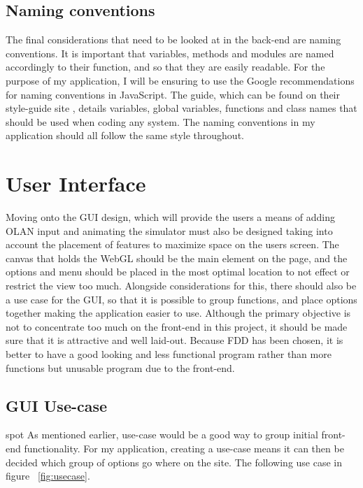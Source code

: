 \subsection{Naming conventions}
The final considerations that need to be looked at in the back-end are naming conventions. It is important that variables, methods and modules are named accordingly to their function, and so that they are easily readable. For the purpose of my application, I will be ensuring to use the Google recommendations for naming conventions in JavaScript. The guide, which can be found on their style-guide site \cite{google_javascript}, details variables, global variables, functions and class names that should be used when coding any system. The naming conventions in my application should all follow the same style throughout.

\section{User Interface}
Moving onto the GUI design, which will provide the users a means of adding OLAN input and animating the simulator must also be designed taking into account the placement of features to maximize space on the users screen. The canvas that holds the WebGL should be the main element on the page, and the options and menu should be placed in the most optimal location to not effect or restrict the view too much. Alongside considerations for this, there should also be a use case for the GUI, so that it is possible to group functions, and place options together making the application easier to use. Although the primary objective is not to concentrate too much on the front-end in this project, it should be made sure that it is attractive and well laid-out. Because FDD has been chosen, it is better to have a good looking and less functional program rather than more functions but unusable program due to the front-end.

\subsection{GUI Use-case}spot
As mentioned earlier, use-case would be a good way to group initial front-end functionality. For my application, creating a use-case means it can then be decided which group of options go where on the site. The following use case in figure ~\ref{fig:usecase}.

